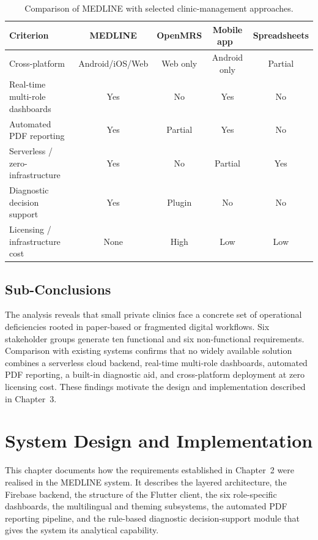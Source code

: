 \documentclass[12pt,a4paper,oneside]{report}
\newcommand{\source}[1]{\par\vspace{2pt}{\small\itshape Source: #1}\par}
\begin{document}
\begin{table}[htbp]
  \centering
  \caption{Comparison of MEDLINE with selected clinic-management approaches.}
  \label{tab:comparison}
  \small
  \begin{tabularx}{\textwidth}{L{3.6cm} c c c c}
    \toprule
    \textbf{Criterion} & \textbf{MEDLINE} & \textbf{OpenMRS} &
      \textbf{Mobile app~\cite{adebayo2021}} & \textbf{Spreadsheets}\\
    \midrule
    Cross-platform & Android/iOS/Web & Web only & Android only & Partial\\
    Real-time multi-role dashboards & Yes & No & Yes & No\\
    Automated PDF reporting & Yes & Partial & Yes & No\\
    Serverless / zero-infrastructure & Yes & No & Partial & Yes\\
    Diagnostic decision support & Yes & Plugin & No & No\\
    Licensing / infrastructure cost & None & High & Low & Low\\
    \bottomrule
  \end{tabularx}
  \source{author's comparative analysis.}
\end{table}

\section{Sub-Conclusions}

The analysis reveals that small private clinics face a concrete set of
operational deficiencies rooted in paper-based or fragmented digital workflows.
Six stakeholder groups generate ten functional and six non-functional
requirements. Comparison with existing systems confirms that no widely
available solution combines a serverless cloud backend, real-time multi-role
dashboards, automated PDF reporting, a built-in diagnostic aid, and
cross-platform deployment at zero licensing cost. These findings motivate the
design and implementation described in Chapter~3.

\chapter{System Design and Implementation}

This chapter documents how the requirements established in Chapter~2 were
realised in the MEDLINE system. It describes the layered architecture, the
Firebase backend, the structure of the Flutter client, the six role-specific
dashboards, the multilingual and theming subsystems, the automated PDF
reporting pipeline, and the rule-based diagnostic decision-support module that
gives the system its analytical capability.
\end{document}
